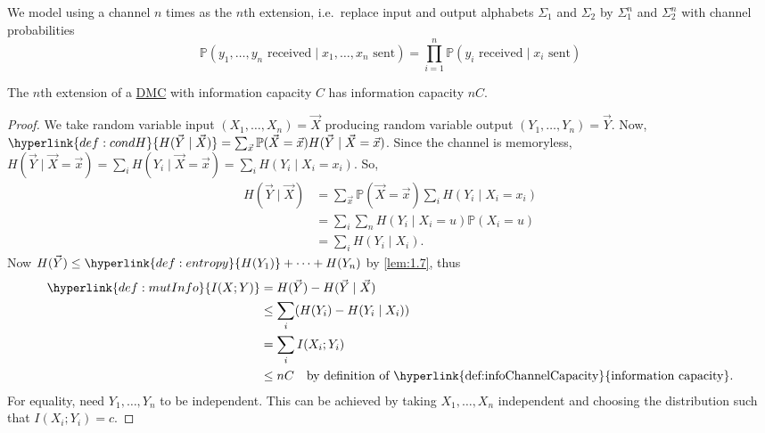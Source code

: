 \documentclass{article}
\newcommand{\Prob}{\mathbb{P}}
\newcommand{\1}[1]{\mathbbm{1}_{#1}}
\begin{document}
We model using a channel $n$ times as the $n$th extension, i.e.\ replace input and output alphabets $\Sigma_1$ and $\Sigma_2$ by $\Sigma_1^n$ and $\Sigma_2^n$ with channel probabilities
\begin{equation*}
    \Prob(y_1, \dotsc, y_n \text{ received} \mid x_1, \dotsc, x_n \text{ sent}) = \prod_{i=1}^n \Prob(y_i \text{ received} \mid x_i \text{ sent})
\end{equation*}

\begin{nlemma}\label{lem:2.14}
    The $n$th extension of a \hyperlink{def:dmc}{DMC} with information capacity $C$ has information capacity $nC$.
\end{nlemma}
\begin{proof}
    We take random variable input $(X_1, \dotsc, X_n) = \vec{X}$ producing random variable output $(Y_1, \dotsc, Y_n) = \vec{Y}$.
    Now, $\hyperlink{def:condH}{H(\vec{Y} \mid \vec{X})} = \sum_{\vec{x}} \Prob(\vec{X} = \vec{x}) H(\vec{Y} \mid \vec{X}=\vec{x})$.
    Since the channel is memoryless, $H(\vec{Y} \mid \vec{X} = \vec{x}) = \sum_i H(Y_i \mid \vec{X} = \vec{x}) = \sum_i H(Y_i \mid X_i = x_i)$.
    So,
    \begin{align*}
        H(\vec{Y} \mid \vec{X}) &= \sum_{\vec{x}} \Prob(\vec{X}=\vec{x}) \sum_i H(Y_i \mid X_i = x_i) \\
                             &= \sum_i \sum_n H(Y_i \mid X_i = u) \Prob(X_i = u) \\
                             &= \sum_i H(Y_i \mid X_i).
    \end{align*}
    Now $H(\vec{Y}) \leq \hyperlink{def:entropy}{H(Y_1)} + \dotsb + H(Y_n)$ by \cref{lem:1.7}, thus
    \begin{align*}
        \hyperlink{def:mutInfo}{I(X; Y)} &= H(\vec{Y}) - H(\vec{Y} \mid \vec{X}) \\
                                         &\leq \sum_i (H(Y_i) - H(Y_i \mid X_i)) \\
                                         &= \sum_i I(X_i ; Y_i) \\
                                         &\leq nC \quad \text{by definition of \hyperlink{def:infoChannelCapacity}{information capacity}}.
    \end{align*}
    For equality, need $Y_1, \dotsc, Y_n$ to be independent. This can be achieved by taking $X_1, \dotsc, X_n$ independent and choosing the distribution such that $I(X_i; Y_i) = c$.
\end{proof}
\end{document}
